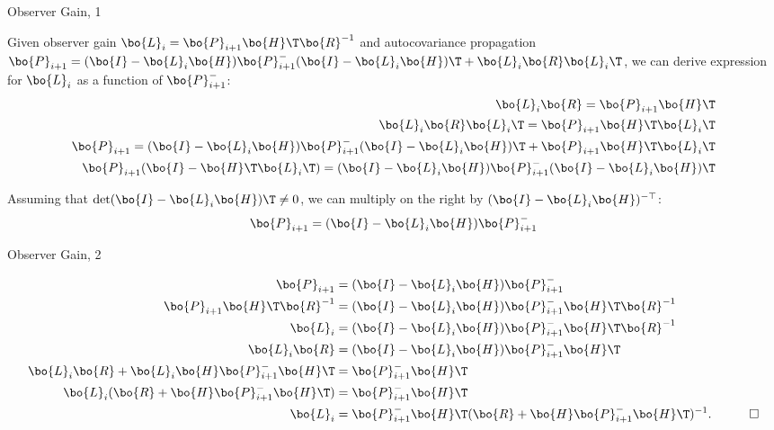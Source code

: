 \documentclass{beamer}
\begin{document}
\begin{frame}{Observer Gain, 1}
	\begin{flushleft}
		
		Given observer gain $\bo{L}_i = \bo{P}_{i+1} \bo{H}\T \bo{R}^{-1}$ and autocovariance propagation $ \bo{P}_{i+1} = (\bo{I} - \bo{L}_i \bo{H}) \bo{P}_{i+1}^- (\bo{I} - \bo{L}_i \bo{H})\T +\bo{L}_i\bo{R}\bo{L}_i\T$, we can derive expression for $\bo{L}_i$ as a function of $\bo{P}_{i+1}^-$:
		\begin{align}
			\bo{L}_i \bo{R} = \bo{P}_{i+1} \bo{H}\T 
			\\
			\bo{L}_i \bo{R}\bo{L}_i\T = \bo{P}_{i+1} \bo{H}\T \bo{L}_i\T
			\\
			\bo{P}_{i+1} = (\bo{I} - \bo{L}_i \bo{H}) \bo{P}_{i+1}^- (\bo{I} - \bo{L}_i \bo{H})\T +\bo{P}_{i+1} \bo{H}\T \bo{L}_i\T
			\\
			\bo{P}_{i+1}(\bo{I}- \bo{H}\T \bo{L}_i\T) = (\bo{I} - \bo{L}_i \bo{H}) \bo{P}_{i+1}^- (\bo{I} - \bo{L}_i \bo{H})\T
		\end{align}
		
		Assuming that $\text{det}(\bo{I}- \bo{L}_i \bo{H} )\T \neq 0$, we can multiply on the right by $(\bo{I}- \bo{L}_i \bo{H} )^{-\top}$:
		\begin{align}
	\bo{P}_{i+1} = (\bo{I} - \bo{L}_i \bo{H}) \bo{P}_{i+1}^- 
		\end{align}		
		
	\end{flushleft}
\end{frame}


\begin{frame}{Observer Gain, 2}
	\begin{flushleft}
		
		\begin{align}
			\bo{P}_{i+1} &= (\bo{I} - \bo{L}_i \bo{H}) \bo{P}_{i+1}^- 
			\\
			\bo{P}_{i+1}\bo{H}\T\bo{R}^{-1} &= (\bo{I} - \bo{L}_i \bo{H}) \bo{P}_{i+1}^- \bo{H}\T\bo{R}^{-1}
			\\
			\bo{L}_i &= (\bo{I} - \bo{L}_i \bo{H}) \bo{P}_{i+1}^- \bo{H}\T\bo{R}^{-1}
			\\
			\bo{L}_i\bo{R} &= (\bo{I} - \bo{L}_i \bo{H}) \bo{P}_{i+1}^- \bo{H}\T
			\\
			\bo{L}_i\bo{R} + \bo{L}_i \bo{H}\bo{P}_{i+1}^- \bo{H}\T &= \bo{P}_{i+1}^- \bo{H}\T 
			\\
			\bo{L}_i (\bo{R} + \bo{H}\bo{P}_{i+1}^- \bo{H}\T) &= \bo{P}_{i+1}^- \bo{H}\T 
			\\
			\bo{L}_i &= \bo{P}_{i+1}^- \bo{H}\T (\bo{R} + \bo{H}\bo{P}_{i+1}^- \bo{H}\T)^{-1}.  \ \ \ \qed
		\end{align}		
		
	\end{flushleft}
\end{frame}
\end{document}

